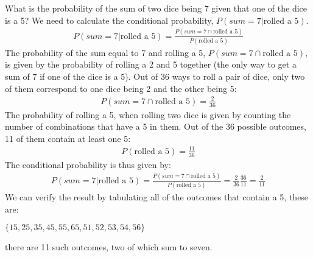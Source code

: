 \begin{example}{}{What is the probability of the sum of two dice being 7 given that one of the dice is a 5?}{}
\label{ex:ConditionalDice1}
We need to calculate the conditional probability, $P(sum=7|\text{rolled a 5})$.
\begin{align}
P(sum=7|\text{rolled a 5})=\frac{P(sum=7 \cap \text{rolled a 5})}{P(\text{rolled a 5})}
\end{align}
The probability of the sum equal to 7 and rolling a 5, $P(sum=7 \cap \text{rolled a 5})$, is given by the probability of rolling  a 2 and 5 together (the only way to get a sum of 7 if one of the dice is a 5). Out of 36 ways to roll a pair of dice, only two of them correspond to one dice being 2 and the other being 5:
\begin{align}
P(sum=7 \cap \text{rolled a 5})=\frac{2}{36}
\end{align}
The probability of rolling a 5, when rolling two dice is given by counting the number of combinations that have a 5 in them. Out of the 36 possible outcomes, 11 of them contain at least one 5:
\begin{align}
P(\text{rolled a 5})=\frac{11}{36}
\end{align}
The conditional probability is thus given by:
\begin{align}
P(sum=7|\text{rolled a 5})=\frac{P(sum=7 \cap \text{rolled a 5})}{P(\text{rolled a 5})}=\frac{2}{36}\frac{36}{11}=\frac{2}{11}
\end{align}
We can verify the result by tabulating all of the outcomes that contain a 5, these are:

 $\{15,25,35,45,55,65,51,52,53,54,56\}$
 
there are 11 such outcomes, two of which sum to seven. 
\end{example}

